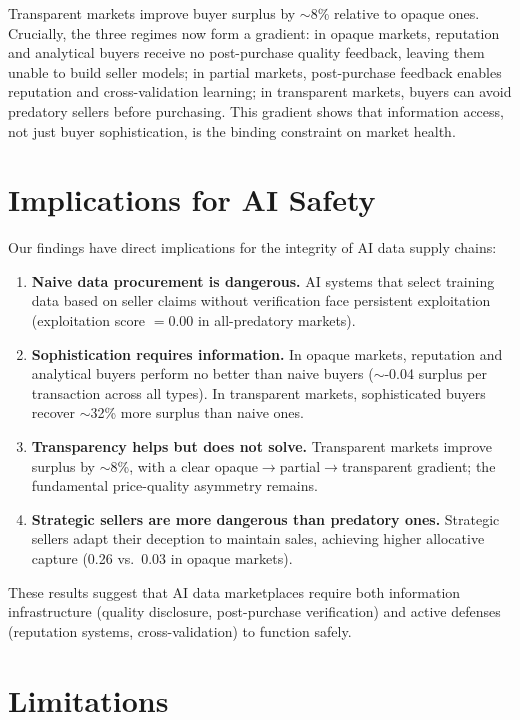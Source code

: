 \documentclass[11pt]{article}
\begin{document}
Transparent markets improve buyer surplus by $\sim$8\% relative to opaque ones.
Crucially, the three regimes now form a gradient: in opaque markets, reputation and analytical buyers receive no post-purchase quality feedback, leaving them unable to build seller models; in partial markets, post-purchase feedback enables reputation and cross-validation learning; in transparent markets, buyers can avoid predatory sellers before purchasing.
This gradient shows that information access, not just buyer sophistication, is the binding constraint on market health.

\section{Implications for AI Safety}

Our findings have direct implications for the integrity of AI data supply chains:

\begin{enumerate}
\item \textbf{Naive data procurement is dangerous.} AI systems that select training data based on seller claims without verification face persistent exploitation (exploitation score $= 0.00$ in all-predatory markets).
\item \textbf{Sophistication requires information.} In opaque markets, reputation and analytical buyers perform no better than naive buyers ($\sim$-0.04 surplus per transaction across all types). In transparent markets, sophisticated buyers recover $\sim$32\% more surplus than naive ones.
\item \textbf{Transparency helps but does not solve.} Transparent markets improve surplus by $\sim$8\%, with a clear opaque$\to$partial$\to$transparent gradient; the fundamental price-quality asymmetry remains.
\item \textbf{Strategic sellers are more dangerous than predatory ones.} Strategic sellers adapt their deception to maintain sales, achieving higher allocative capture (0.26 vs.\ 0.03 in opaque markets).
\end{enumerate}

These results suggest that AI data marketplaces require both information infrastructure (quality disclosure, post-purchase verification) and active defenses (reputation systems, cross-validation) to function safely.

\section{Limitations}
\end{document}
